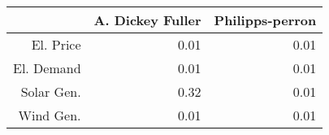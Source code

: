 \begin{table}[ht]
\centering
\begin{tabular}{rrr}
  \hline
 & A. Dickey Fuller & Philipps-perron \\ 
  \hline
El. Price & 0.01 & 0.01 \\ 
  El. Demand & 0.01 & 0.01 \\ 
  Solar Gen. & 0.32 & 0.01 \\ 
  Wind Gen. & 0.01 & 0.01 \\ 
   \hline
\end{tabular}
\end{table}
